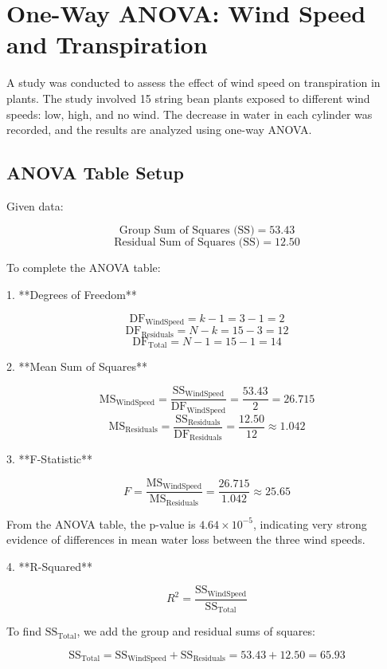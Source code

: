 \documentclass{article}
\begin{document}
\section*{One-Way ANOVA: Wind Speed and Transpiration}

A study was conducted to assess the effect of wind speed on transpiration in plants. The study involved 15 string bean plants exposed to different wind speeds: low, high, and no wind. The decrease in water in each cylinder was recorded, and the results are analyzed using one-way ANOVA.

\subsection*{ANOVA Table Setup}

Given data:

\[
\text{Group Sum of Squares (SS)} = 53.43
\]
\[
\text{Residual Sum of Squares (SS)} = 12.50
\]

To complete the ANOVA table:

1. **Degrees of Freedom**

   \[
   \text{DF}_{\text{WindSpeed}} = k - 1 = 3 - 1 = 2
   \]
   \[
   \text{DF}_{\text{Residuals}} = N - k = 15 - 3 = 12
   \]
   \[
   \text{DF}_{\text{Total}} = N - 1 = 15 - 1 = 14
   \]

2. **Mean Sum of Squares**

   \[
   \text{MS}_{\text{WindSpeed}} = \frac{\text{SS}_{\text{WindSpeed}}}{\text{DF}_{\text{WindSpeed}}} = \frac{53.43}{2} = 26.715
   \]
   \[
   \text{MS}_{\text{Residuals}} = \frac{\text{SS}_{\text{Residuals}}}{\text{DF}_{\text{Residuals}}} = \frac{12.50}{12} \approx 1.042
   \]

3. **F-Statistic**

   \[
   F = \frac{\text{MS}_{\text{WindSpeed}}}{\text{MS}_{\text{Residuals}}} = \frac{26.715}{1.042} \approx 25.65
   \]

   From the ANOVA table, the p-value is \( 4.64 \times 10^{-5} \), indicating very strong evidence of differences in mean water loss between the three wind speeds.

4. **R-Squared**

   \[
   R^2 = \frac{\text{SS}_{\text{WindSpeed}}}{\text{SS}_{\text{Total}}}
   \]

   To find \(\text{SS}_{\text{Total}}\), we add the group and residual sums of squares:

   \[
   \text{SS}_{\text{Total}} = \text{SS}_{\text{WindSpeed}} + \text{SS}_{\text{Residuals}} = 53.43 + 12.50 = 65.93
   \]
\end{document}
